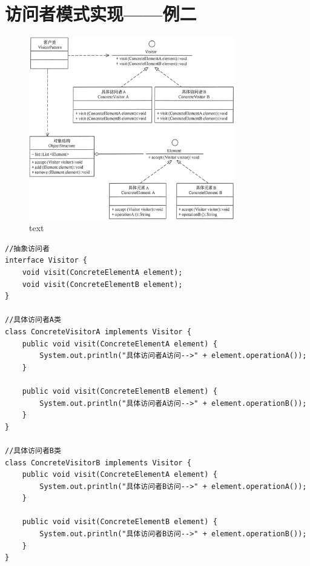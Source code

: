 \section{访问者模式实现——例二}
\begin{figure}[!h]
	\centering
	\includegraphics[width=0.8\textwidth]{image/13-2}
	\caption{text}
\end{figure}
\begin{lstlisting}
//抽象访问者
interface Visitor {
	void visit(ConcreteElementA element);
	void visit(ConcreteElementB element);
}

//具体访问者A类
class ConcreteVisitorA implements Visitor {
	public void visit(ConcreteElementA element) {
		System.out.println("具体访问者A访问-->" + element.operationA());
	}
	
	public void visit(ConcreteElementB element) {
		System.out.println("具体访问者A访问-->" + element.operationB());
	}
}

//具体访问者B类
class ConcreteVisitorB implements Visitor {
	public void visit(ConcreteElementA element) {
		System.out.println("具体访问者B访问-->" + element.operationA());
	}
	
	public void visit(ConcreteElementB element) {
		System.out.println("具体访问者B访问-->" + element.operationB());
	}
}
\end{lstlisting}

